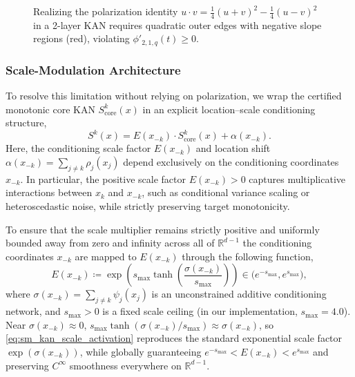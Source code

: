 \documentclass[11pt,a4paper]{article}
\theoremstyle{plain}
\theoremstyle{definition}
\theoremstyle{remark}
\begin{document}
\begin{figure}[H]
\caption{Realizing the polarization identity $u \cdot v = \frac{1}{4}(u+v)^2 - \frac{1}{4}(u-v)^2$ in a 2-layer KAN requires quadratic outer edges with negative slope regions (red), violating $\phi'_{2,1,q}(t) \ge 0$.}
\label{fig:polarization_obstruction}
\end{figure}

\subsubsection{Scale-Modulation Architecture}
\label{subsubsec:scale_modulation_arch}
To resolve this limitation without relying on polarization, we wrap the certified monotonic core KAN $S^k_{\text{core}}(x)$ in an explicit location--scale conditioning structure,
\begin{equation}
    S^k(x) = E(x_{-k}) \cdot S^k_{\text{core}}(x) + \alpha(x_{-k}).
\end{equation}
Here, the conditioning scale factor $E(x_{-k})$ and location shift $\alpha(x_{-k}) = \sum_{j \neq k} \rho_j(x_j)$ depend exclusively on the conditioning coordinates $x_{-k}$. In particular, the positive scale factor $E(x_{-k}) > 0$ captures multiplicative interactions between $x_k$ and $x_{-k}$, such as conditional variance scaling or heteroscedastic noise, while strictly preserving target monotonicity.

To ensure that the scale multiplier remains strictly positive and uniformly bounded away from zero and infinity across all of $\mathbb{R}^{d-1}$ the conditioning coordinates $x_{-k}$ are mapped to $E(x_{-k})$ through the following function,
\begin{equation}
    E(x_{-k}) \coloneqq \exp\left( s_{\max} \tanh\left( \frac{\sigma(x_{-k})}{s_{\max}} \right) \right) \in \big(e^{-s_{\max}}, e^{s_{\max}}\big),
    \label{eq:sm_kan_scale_activation}
\end{equation}
where $\sigma(x_{-k}) = \sum_{j \neq k} \psi_j(x_j)$ is an unconstrained additive conditioning network, and $s_{\max} > 0$ is a fixed scale ceiling (in our implementation, $s_{\max} = 4.0$). Near $\sigma(x_{-k}) \approx 0$, $s_{\max}\tanh(\sigma(x_{-k}) / s_{\max}) \approx \sigma(x_{-k})$, so \eqref{eq:sm_kan_scale_activation} reproduces the standard exponential scale factor $\exp(\sigma(x_{-k}))$, while globally guaranteeing $e^{-s_{\max}} < E(x_{-k}) < e^{s_{\max}}$ and preserving $C^\infty$ smoothness everywhere on $\mathbb{R}^{d-1}$.
\end{document}
